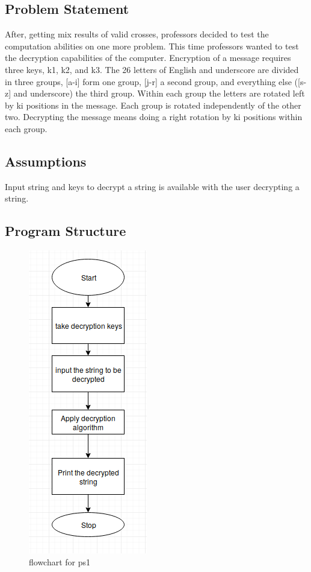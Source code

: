 \documentclass[a4paper,12pt]{article}
\begin{document}
	\subsection{Problem Statement}
		After, getting mix results of valid crosses, professors decided to test the computation abilities on one more problem. This time professors wanted to test the decryption capabilities of the computer.
	Encryption of  a message requires three keys, k1, k2, and k3. The 26 letters of English and underscore are divided in three groups,  [a-i] form one group, [j-r] a second group, and everything else ([s-z] and underscore) the third group. Within each group the letters are rotated left by ki positions in the message. Each group is rotated independently of the other two. Decrypting the message means doing a right rotation by ki positions within each group.
	
	\subsection{Assumptions}
	Input string and keys to decrypt a string is available with the user decrypting a string.
	\newpage
	\subsection{Program Structure}
	
	
	\begin{figure}[h]
	\includegraphics[scale=0.8]{flow2.png}
	\caption{flowchart for ps1}
	\label{fig:flow}
	\end{figure}
	
\end{document}
